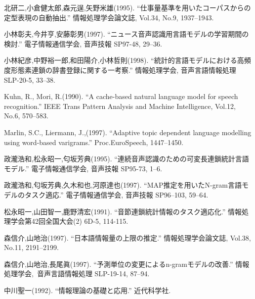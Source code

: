 \begin{thebibliography}{99}
    北研二,小倉健太郎,森元逞,矢野米雄(1995).
    ``\mbox{仕事量基準を用いたコーパスからの定型表現の自}動抽出.''
    情報処理学会論文誌, Vol.34, No.9, 1937--1943.

    小林彰夫,今井亨,安藤彰男(1997).
    ``ニュース音声認識用言語モデルの学習期間の検討.''
    電子情報通信学会, 音声技報 SP97-48, 29--36.

    小林紀彦,中野裕一郎,和田陽介,小林哲則(1998).
    ``統計的言語モデルにおける\mbox{高頻度形態素連鎖}の辞書登録に関する一考察.''
    情報処理学会, 音声言語情報処理 SLP-20-5, 33--38.

    Kuhn, R., Mori, R.(1990).
    ``A cache-based natural language model for speech recognition.''
    IEEE Trans Pattern Analysis and Machine Intelligence, Vol.12, No.6, 570--583.

    Marlin, S.C., Liermann, J.,(1997).
    ``Adaptive topic dependent language modelling using word-based varigrams.''
    Proc.EuroSpeech, 1447--1450.

    政瀧浩和,松永昭一,匂坂芳典(1995).
    ``連続音声認識のための可変長連鎖統計言語モデル.''
    電子情報通信学会, 音声技報 SP95-73, 1--6.


    政瀧浩和,匂坂芳典,久木和也,河原達也(1997).
    ``MAP推定を用いたN-gram言語モデルのタスク適応.''
    電子情報通信学会, 音声技報 SP96--103, 59--64.

 
    松永昭一,山田智一,鹿野清宏(1991).
    ``音節連鎖統計情報のタスク適応化.''
    \mbox{情報処理学会第42回}全国大会(2) 6D-5, 114-115.

    森信介,山地治(1997). 
    ``日本語情報量の上限の推定.''
    情報処理学会論文誌, Vol.38, No.11, 2191--2199.

    森信介,山地治,長尾眞(1997).
    ``予測単位の変更によるn-gramモデルの改善.''
    \mbox{情報処理学会, 音}声言語情報処理 SLP-19-14, 87--94.

    中川聖一(1992).
    ``情報理論の基礎と応用.'' 
    近代科学社.


\end{thebibliography}
